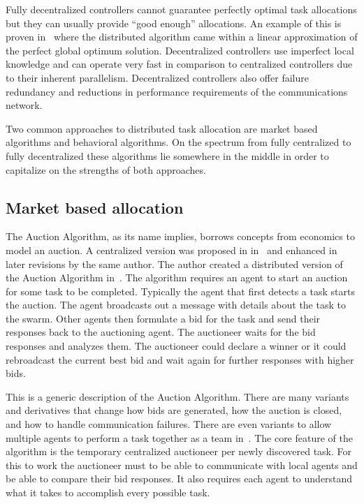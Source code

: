 Fully decentralized controllers cannot guarantee perfectly optimal task allocations but they can usually provide ``good enough'' allocations.  An example of this is proven in~\cite{auction_linear_approx} where the distributed algorithm came within a linear approximation of the perfect global optimum solution.  Decentralized controllers use imperfect local knowledge and can operate very fast in comparison to centralized controllers due to their inherent parallelism.  Decentralized controllers also offer failure redundancy and reductions in performance requirements of the communications network.

Two common approaches to distributed task allocation are market based algorithms and behavioral algorithms.  On the spectrum from fully centralized to fully decentralized these algorithms lie somewhere in the middle in order to capitalize on the strengths of both approaches.

\subsection{Market based allocation}

The Auction Algorithm, as its name implies, borrows concepts from economics to model an auction.  A centralized version was proposed in in~\cite{auction_derive} and enhanced in later revisions by the same author.  The author created a distributed version of the Auction Algorithm in~\cite{auction_parallel}.  The algorithm requires an agent to start an auction for some task to be completed.  Typically the agent that first detects a task starts the auction.  The agent broadcasts out a message with details about the task to the swarm.  Other agents then formulate a bid for the task and send their responses back to the auctioning agent.  The auctioneer waits for the bid responses and analyzes them.  The auctioneer could declare a winner or it could rebroadcast the current best bid and wait again for further responses with higher bids.  

This is a generic description of the Auction Algorithm.  There are many variants and derivatives that change how bids are generated, how the auction is closed, and how to handle communication failures.  There are even variants to allow multiple agents to perform a task together as a team in~\cite{auction_team}.  The core feature of the algorithm is the temporary centralized auctioneer per newly discovered task.  For this to work the auctioneer must to be able to communicate with local agents and be able to compare their bid responses.  It also requires each agent to understand what it takes to accomplish every possible task.


